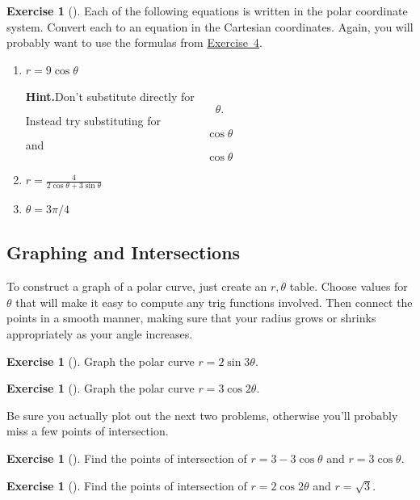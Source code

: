 \documentclass[10pt,]{book}
\theoremstyle{plain}
\theoremstyle{definition}
\theoremstyle{definition}
\theoremstyle{definition}
\theoremstyle{definition}
\newtheorem{exploration}[project]{Exercise}
\theoremstyle{definition}
\numberwithin{equation}{section}
\newcommand{\ds}{\displaystyle}
\begin{document}
\begin{exploration}[]\label{exploration-90}
Each of the following equations is written in the polar coordinate system. Convert each to an equation in the Cartesian coordinates. Again, you will probably want to use the formulas from \hyperref[prob_polar_coordinate_equations]{Exercise~4}.%
\begin{enumerate}[font=\bfseries,label=(\alph*),ref=\alph*]
\item\label{task-154} \(r=9\cos\theta\)%
\par\medskip\noindent%
\textbf{Hint.}\quad Don't substitute directly for%
\begin{equation*}
\theta\text{.}
\end{equation*}
Instead try substituting for%
\begin{equation*}
\cos\theta
\end{equation*}
and%
\begin{equation*}
\cos\theta
\end{equation*}
%
\item\label{task-155} \(\ds r=\frac{4}{2\cos\theta+3\sin\theta}\)%
\item\label{task-156} \(\theta = 3\pi/4\)%
\end{enumerate}
\end{exploration}
\typeout{************************************************}
\typeout{************************************************}
\subsection[{Graphing and Intersections}]{Graphing and Intersections}\label{subsection-20}
To construct a graph of a polar curve, just create an \(r,\theta\) table. Choose values for \(\theta\) that will make it easy to compute any trig functions involved. Then connect the points in a smooth manner, making sure that your radius grows or shrinks appropriately as your angle increases.%
\begin{exploration}[]\label{exploration-91}
Graph the polar curve \(r=2\sin 3\theta\).%
\end{exploration}
\begin{exploration}[]\label{exploration-92}
Graph the polar curve \(r=3\cos 2\theta\).%
\end{exploration}
Be sure you actually plot out the next two problems, otherwise you'll probably miss a few points of intersection.%
\begin{exploration}[]\label{exploration-93}
Find the points of intersection of \(r=3-3\cos\theta\) and \(r=3\cos\theta\).%
\end{exploration}
\begin{exploration}[]\label{exploration-94}
Find the points of intersection of \(r=2\cos 2\theta\) and \(r=\sqrt 3\).%
\end{exploration}
\typeout{************************************************}
\typeout{************************************************}
\end{document}
